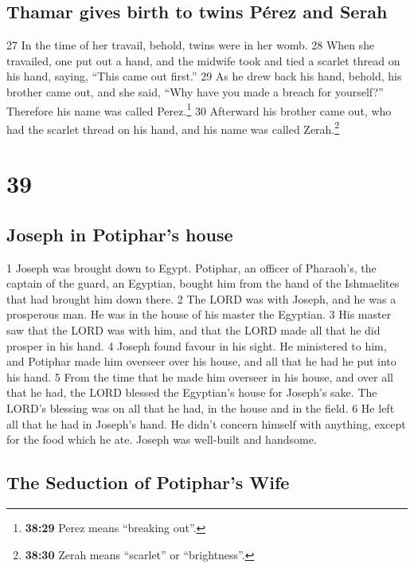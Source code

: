 \hypertarget{thamar-gives-birth-to-twins-puxe9rez-and-serah}{%
\subsection{Thamar gives birth to twins Pérez and
Serah}\label{thamar-gives-birth-to-twins-puxe9rez-and-serah}}

{27} In the time of her travail, behold, twins were in her womb. {28}
When she travailed, one put out a hand, and the midwife took and tied a
scarlet thread on his hand, saying, ``This came out first.'' {29} As he
drew back his hand, behold, his brother came out, and she said, ``Why
have you made a breach for yourself?'' Therefore his name was called
Perez.\footnote{\textbf{38:29} Perez means ``breaking out''.} {30}
Afterward his brother came out, who had the scarlet thread on his hand,
and his name was called Zerah.\footnote{\textbf{38:30} Zerah means
  ``scarlet'' or ``brightness''.}

\hypertarget{section-38}{%
\section{39}\label{section-38}}

\hypertarget{joseph-in-potiphars-house}{%
\subsection{Joseph in Potiphar's
house}\label{joseph-in-potiphars-house}}

{1} Joseph was brought down to Egypt. Potiphar, an officer of Pharaoh's,
the captain of the guard, an Egyptian, bought him from the hand of the
Ishmaelites that had brought him down there. {2} The LORD was with
Joseph, and he was a prosperous man. He was in the house of his master
the Egyptian. {3} His master saw that the LORD was with him, and that
the LORD made all that he did prosper in his hand. {4} Joseph found
favour in his sight. He ministered to him, and Potiphar made him
overseer over his house, and all that he had he put into his hand. {5}
From the time that he made him overseer in his house, and over all that
he had, the LORD blessed the Egyptian's house for Joseph's sake. The
LORD's blessing was on all that he had, in the house and in the field.
{6} He left all that he had in Joseph's hand. He didn't concern himself
with anything, except for the food which he ate. Joseph was well-built
and handsome.

\hypertarget{the-seduction-of-potiphars-wife}{%
\subsection{The Seduction of Potiphar's
Wife}\label{the-seduction-of-potiphars-wife}}

